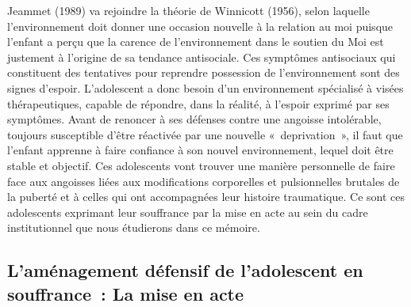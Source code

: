 \documentclass[12pt, a4paper]{book}
\begin{document}
\begin{spacing}{1.5}
Jeammet (1989) va rejoindre la théorie de Winnicott (1956), selon laquelle  l'environnement doit donner une occasion nouvelle à la relation au moi puisque l'enfant a perçu que la carence de l'environnement dans le soutien du Moi est justement à l'origine de sa tendance antisociale. Ces symptômes antisociaux qui constituent des tentatives pour reprendre possession de l'environnement sont des signes d'espoir. L'adolescent a donc besoin d'un environnement spécialisé à visées thérapeutiques, capable de répondre, dans la réalité, à l'espoir exprimé par ses symptômes. Avant de renoncer à ses défenses contre une angoisse intolérable, toujours susceptible d'être réactivée par une nouvelle « deprivation », il faut que l'enfant apprenne à faire confiance à son nouvel environnement, lequel doit être stable et objectif. Ces adolescents vont trouver une manière personnelle de faire face aux angoisses liées aux modifications corporelles et pulsionnelles brutales de la puberté et à celles qui ont accompagnées leur histoire traumatique. Ce sont ces adolescents exprimant leur souffrance par la mise en acte au sein du cadre institutionnel que nous étudierons dans ce mémoire. 

\subsection{L'aménagement défensif de l'adolescent en souffrance : La mise en acte}


\end{spacing}
\end{document}
